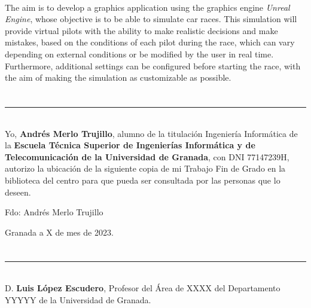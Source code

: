 \vspace{0.7cm}
\\

The aim is to develop a graphics application using the graphics engine \textit{Unreal Engine}, whose objective is to be able to simulate car races. This simulation will provide virtual pilots with the ability to make realistic decisions and make mistakes, based on the conditions of each pilot during the race, which can vary depending on external conditions or be modified by the user in real time. Furthermore, additional settings can be configured before starting the race, with the aim of making the simulation as customizable as possible.

\chapter*{}
\thispagestyle{empty}

\noindent\rule[-1ex]{\textwidth}{2pt}\\[4.5ex]

Yo, \textbf{Andrés Merlo Trujillo}, alumno de la titulación Ingeniería Informática de la \textbf{Escuela Técnica Superior
de Ingenierías Informática y de Telecomunicación de la Universidad de Granada}, con DNI 77147239H, autorizo la
ubicación de la siguiente copia de mi Trabajo Fin de Grado en la biblioteca del centro para que pueda ser
consultada por las personas que lo deseen.

\vspace{6cm}

\noindent Fdo: Andrés Merlo Trujillo

\vspace{2cm}

\begin{flushright}
Granada a X de mes de 2023.
\end{flushright}


\chapter*{}
\thispagestyle{empty}

\noindent\rule[-1ex]{\textwidth}{2pt}\\[4.5ex]

D. \textbf{Luis López Escudero}, Profesor del Área de XXXX del Departamento YYYYY de la Universidad de Granada.


